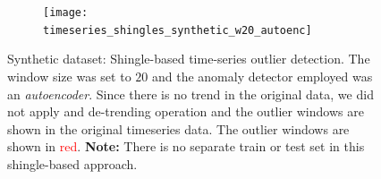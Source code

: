 \documentclass{article} %
\begin{document}
\begin{figure}
	\centering
	\captionsetup{labelformat=empty}
	\begin{subfigure}[b]{1.0\textwidth}
		\texttt{[image: timeseries\_shingles\_synthetic\_w20\_autoenc]}
		\label{fig:autoenc}
	\end{subfigure}
    \caption{Synthetic dataset: Shingle-based time-series outlier detection. The window size was set to $20$ and the anomaly detector employed was an \textit{autoencoder}. Since there is no trend in the original data, we did not apply and de-trending operation and the outlier windows are shown in the original timeseries data. The outlier windows are shown in \textcolor{red}{red}. \textbf{Note:} There is no separate train or test set in this shingle-based approach.}
	\label{fig:synthetic}
\end{figure}
\end{document}

